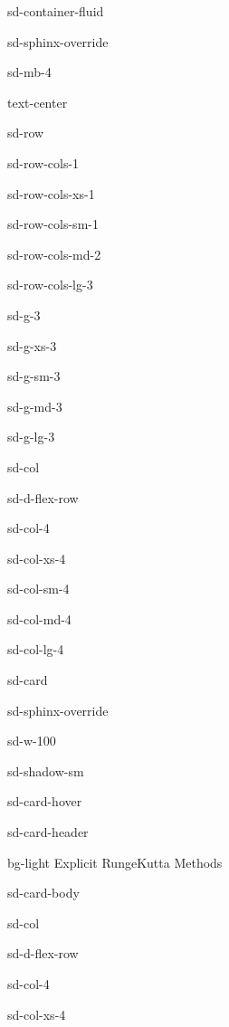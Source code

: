 \documentclass[letterpaper,10pt,english]{jupyterBook}
\begin{document}
\begin{sphinxuseclass}{sd-container-fluid}
\begin{sphinxuseclass}{sd-sphinx-override}
\begin{sphinxuseclass}{sd-mb-4}
\begin{sphinxuseclass}{text-center}
\begin{sphinxuseclass}{sd-row}
\begin{sphinxuseclass}{sd-row-cols-1}
\begin{sphinxuseclass}{sd-row-cols-xs-1}
\begin{sphinxuseclass}{sd-row-cols-sm-1}
\begin{sphinxuseclass}{sd-row-cols-md-2}
\begin{sphinxuseclass}{sd-row-cols-lg-3}
\begin{sphinxuseclass}{sd-g-3}
\begin{sphinxuseclass}{sd-g-xs-3}
\begin{sphinxuseclass}{sd-g-sm-3}
\begin{sphinxuseclass}{sd-g-md-3}
\begin{sphinxuseclass}{sd-g-lg-3}
\begin{sphinxuseclass}{sd-col}
\begin{sphinxuseclass}{sd-d-flex-row}
\begin{sphinxuseclass}{sd-col-4}
\begin{sphinxuseclass}{sd-col-xs-4}
\begin{sphinxuseclass}{sd-col-sm-4}
\begin{sphinxuseclass}{sd-col-md-4}
\begin{sphinxuseclass}{sd-col-lg-4}
\begin{sphinxuseclass}{sd-card}
\begin{sphinxuseclass}{sd-sphinx-override}
\begin{sphinxuseclass}{sd-w-100}
\begin{sphinxuseclass}{sd-shadow-sm}
\begin{sphinxuseclass}{sd-card-hover}
\begin{sphinxuseclass}{sd-card-header}
\begin{sphinxuseclass}{bg-light}
\sphinxAtStartPar
Explicit Runge\sphinxhyphen{}Kutta Methods

\end{sphinxuseclass}
\end{sphinxuseclass}
\begin{sphinxuseclass}{sd-card-body}
\begin{figure}[htbp]
\centering

\noindent{}
\end{figure}

\end{sphinxuseclass}{\hyperref[\detokenize{2_ERKs/2.0_ERKs::doc}]{}}
\end{sphinxuseclass}
\end{sphinxuseclass}
\end{sphinxuseclass}
\end{sphinxuseclass}
\end{sphinxuseclass}
\end{sphinxuseclass}
\end{sphinxuseclass}
\end{sphinxuseclass}
\end{sphinxuseclass}
\end{sphinxuseclass}
\end{sphinxuseclass}
\end{sphinxuseclass}
\begin{sphinxuseclass}{sd-col}
\begin{sphinxuseclass}{sd-d-flex-row}
\begin{sphinxuseclass}{sd-col-4}
\begin{sphinxuseclass}{sd-col-xs-4}

\end{sphinxuseclass}
\end{sphinxuseclass}
\end{sphinxuseclass}
\end{sphinxuseclass}
\end{sphinxuseclass}
\end{sphinxuseclass}
\end{sphinxuseclass}
\end{sphinxuseclass}
\end{sphinxuseclass}
\end{sphinxuseclass}
\end{sphinxuseclass}
\end{sphinxuseclass}
\end{sphinxuseclass}
\end{sphinxuseclass}
\end{sphinxuseclass}
\end{sphinxuseclass}
\end{sphinxuseclass}
\end{sphinxuseclass}
\end{sphinxuseclass}
\end{document}
